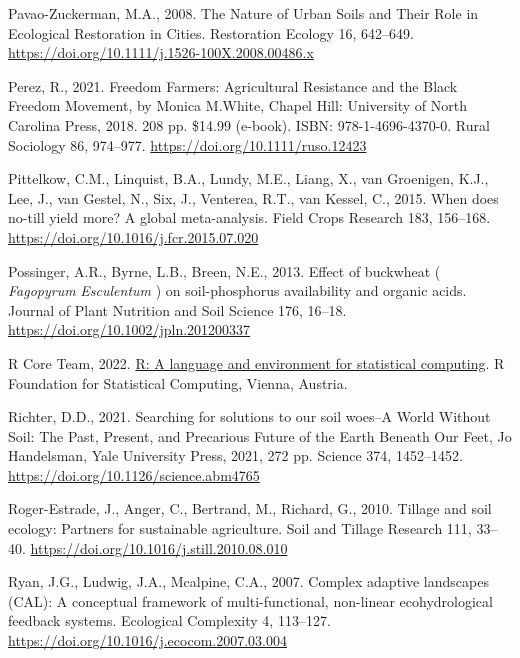 \documentclass[
  12pt,
]{article}
\newlength{\cslhangindent}
\newlength{\cslentryspacingunit} %
\newenvironment{CSLReferences}[2] %
 {%
  \setlength{\parindent}{0pt}
  \ifodd #1
  \let\oldpar\par
  \def\par{\hangindent=\cslhangindent\oldpar}
  \fi
  \setlength{\parskip}{#2\cslentryspacingunit}
 }%
 {}
\begin{document}
\begin{CSLReferences}{1}{0}
\leavevmode{}%
Pavao-Zuckerman, M.A., 2008. The {Nature} of {Urban Soils} and {Their Role} in {Ecological Restoration} in {Cities}. Restoration Ecology 16, 642--649. \url{https://doi.org/10.1111/j.1526-100X.2008.00486.x}

\leavevmode{}%
Perez, R., 2021. Freedom {Farmers}: {Agricultural Resistance} and the {Black Freedom Movement}, by {Monica M}.{White}, {Chapel Hill}: {University} of {North Carolina Press}, 2018. 208 pp. \$14.99 (e-book). {ISBN}: 978-1-4696-4370-0. Rural Sociology 86, 974--977. \url{https://doi.org/10.1111/ruso.12423}

\leavevmode{}%
Pittelkow, C.M., Linquist, B.A., Lundy, M.E., Liang, X., van Groenigen, K.J., Lee, J., van Gestel, N., Six, J., Venterea, R.T., van Kessel, C., 2015. When does no-till yield more? {A} global meta-analysis. Field Crops Research 183, 156--168. \url{https://doi.org/10.1016/j.fcr.2015.07.020}

\leavevmode{}%
Possinger, A.R., Byrne, L.B., Breen, N.E., 2013. Effect of buckwheat ( {\emph{Fagopyrum}}{ \emph{Esculentum}} ) on soil-phosphorus availability and organic acids. Journal of Plant Nutrition and Soil Science 176, 16--18. \url{https://doi.org/10.1002/jpln.201200337}

\leavevmode{}%
R Core Team, 2022. \href{https://www.R-project.org/}{R: A language and environment for statistical computing}. R Foundation for Statistical Computing, Vienna, Austria.

\leavevmode{}%
Richter, D.D., 2021. Searching for solutions to our soil woes--{A World Without Soil}: {The Past}, {Present}, and {Precarious Future} of the {Earth Beneath Our Feet}, {Jo Handelsman}, {Yale University Press}, 2021, 272 pp. Science 374, 1452--1452. \url{https://doi.org/10.1126/science.abm4765}

\leavevmode{}%
Roger-Estrade, J., Anger, C., Bertrand, M., Richard, G., 2010. Tillage and soil ecology: {Partners} for sustainable agriculture. Soil and Tillage Research 111, 33--40. \url{https://doi.org/10.1016/j.still.2010.08.010}

\leavevmode{}%
Ryan, J.G., Ludwig, J.A., Mcalpine, C.A., 2007. Complex adaptive landscapes ({CAL}): {A} conceptual framework of multi-functional, non-linear ecohydrological feedback systems. Ecological Complexity 4, 113--127. \url{https://doi.org/10.1016/j.ecocom.2007.03.004}


\end{CSLReferences}
\end{document}
